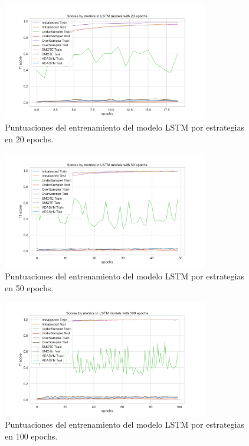 \begin{figure}[h!]
	\centering
	\includegraphics[width=0.8\textwidth]{"figuras/Experimento5/LSTM/LSTM_20_train"}
	\caption{Puntuaciones del entrenamiento del modelo LSTM por estrategias en 20 epochs.}
	\label{an:44}
\end{figure}

\begin{figure}[h!]
	\centering
	\includegraphics[width=0.8\textwidth]{"figuras/Experimento5/LSTM/LSTM_50_train"}
	\caption{Puntuaciones del entrenamiento del modelo LSTM por estrategias en 50 epochs.}
	\label{an:45}
\end{figure}

\begin{figure}[h!]
	\centering
	\includegraphics[width=0.8\textwidth]{"figuras/Experimento5/LSTM/LSTM_100_train"}
	\caption{Puntuaciones del entrenamiento del modelo LSTM por estrategias en 100 epochs.}
	\label{an:46}
\end{figure}

